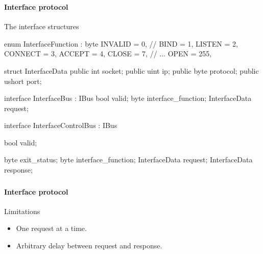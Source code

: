 \begin{frame}[fragile]
    \frametitle{\ImplementationTitle}
    \framesubtitle{Interface protocol}
    The interface structures\\
    \begin{minipage}[t]{0.4\textwidth}
        \begin{mintedcsharp}
            enum InterfaceFunction : byte
            {
                INVALID = 0,
                // BIND = 1,
                LISTEN = 2,
                CONNECT = 3,
                ACCEPT = 4,
                CLOSE = 7,
                // ...
                OPEN = 255,
            }

            struct InterfaceData
            {
                public int socket;
                public uint ip;
                public byte protocol;
                public ushort port;
            }
        \end{mintedcsharp}
    \end{minipage}%
    \hfill%
    \begin{minipage}[t]{0.4\textwidth}
        \begin{mintedcsharp}
            interface InterfaceBus : IBus
            {
                bool valid;
                byte interface_function;
                InterfaceData request;
            }

            interface InterfaceControlBus : IBus
            {
                bool valid;

                byte exit_status;
                byte interface_function;
                InterfaceData request;
                InterfaceData response;
            }
        \end{mintedcsharp}
    \end{minipage}
\end{frame}


\begin{frame}%
    \frametitle{\ImplementationTitle}
    \framesubtitle{Interface protocol}
    Limitations
    \begin{itemize}
        \item One request at a time.
        \item Arbitrary delay between request and response.
    \end{itemize}
\end{frame}
